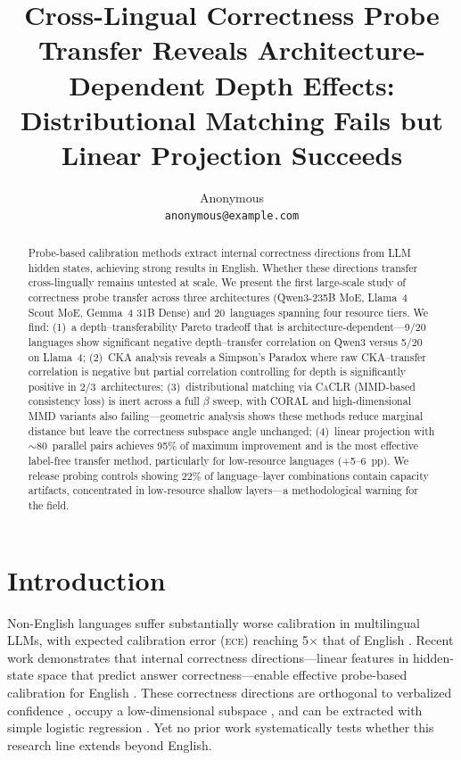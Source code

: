 \documentclass[11pt,a4paper]{article}
\title{Cross-Lingual Correctness Probe Transfer Reveals Architecture-Dependent Depth Effects:\\ Distributional Matching Fails but Linear Projection Succeeds}
\author{
  Anonymous \\
  \texttt{anonymous@example.com}
}
\date{}
\newcommand{\ece}{\textsc{ece}}
\newcommand{\caclr}{\textsc{CaCLR}}
\newcommand{\cka}{\textsc{CKA}}
\begin{document}
\maketitle

\begin{abstract}
Probe-based calibration methods extract internal correctness directions from LLM hidden states, achieving strong results in English. Whether these directions transfer cross-lingually remains untested at scale. We present the first large-scale study of correctness probe transfer across three architectures (Qwen3-235B MoE, Llama~4 Scout MoE, Gemma~4 31B Dense) and 20~languages spanning four resource tiers. We find: (1)~a depth--transferability Pareto tradeoff that is architecture-dependent---9/20 languages show significant negative depth--transfer correlation on Qwen3 versus 5/20 on Llama~4; (2)~\cka{} analysis reveals a Simpson's Paradox where raw CKA--transfer correlation is negative but partial correlation controlling for depth is significantly positive in 2/3~architectures; (3)~distributional matching via \caclr{} (MMD-based consistency loss) is inert across a full $\beta$ sweep, with CORAL and high-dimensional MMD variants also failing---geometric analysis shows these methods reduce marginal distance but leave the correctness subspace angle unchanged; (4)~linear projection with ${\sim}80$~parallel pairs achieves 95\% of maximum improvement and is the most effective label-free transfer method, particularly for low-resource languages (+5--6~pp). We release probing controls showing 22\% of language--layer combinations contain capacity artifacts, concentrated in low-resource shallow layers---a methodological warning for the field.
\end{abstract}

\section{Introduction}

Non-English languages suffer substantially worse calibration in multilingual LLMs, with expected calibration error (\ece{}) reaching 5$\times$ that of English \cite{zhou2025lace}. Recent work demonstrates that internal correctness directions---linear features in hidden-state space that predict answer correctness---enable effective probe-based calibration for English \cite{miao2026coral,joshi2025calibration,confidence_manifold2026}. These correctness directions are orthogonal to verbalized confidence \cite{miao2026closing}, occupy a low-dimensional subspace \cite{confidence_manifold2026}, and can be extracted with simple logistic regression \cite{joshi2025calibration}. Yet no prior work systematically tests whether this research line extends beyond English.
\end{document}
